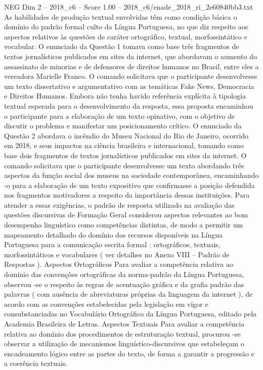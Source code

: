 \begin{textsample}{NEG Dim 2 – 2018\_c6 – Score 1.00 – 2018\_c6/enade\_2018\_ri\_2e60840bb3.txt}
As habilidades de produção textual envolvidas têm como condição básica o domínio do padrão formal culto da Língua Portuguesa, no que diz respeito aos aspectos relativos às questões de caráter ortográfico, textual, morfossintático e vocabular.
O enunciado da Questão 1 tomava como base três fragmentos de textos jornalísticos publicados em sites da internet, que abordavam o aumento do assassinato de minorias e de defensores de direitos humanos no Brasil, entre eles a vereadora Marielle Franco.
O comando solicitava que o participante desenvolvesse um texto dissertativo e argumentativo com as temáticas Fake News, Democracia e Direitos Humanos.
Embora não tenha havido referência explícita à tipologia textual esperada para o desenvolvimento da resposta, essa proposta encaminhou o participante para a elaboração de um texto opinativo, com o objetivo de discutir o problema e manifestar um posicionamento crítico.
O enunciado da Questão 2 abordava o incêndio do Museu Nacional do Rio de Janeiro, ocorrido em 2018, e seus impactos na ciência brasileira e internacional, tomando como base dois fragmentos de textos jornalísticos publicados em sites da internet.
O comando solicitava que o participante desenvolvesse um texto abordando três aspectos da função social dos museus na sociedade contemporânea, encaminhando -o para a elaboração de um texto expositivo que confirmasse a posição defendida nos fragmentos motivadores a respeito da importância dessas instituições.
Para atender a essas exigências, o padrão de resposta utilizado na avaliação das questões discursivas de Formação Geral considerou aspectos relevantes ao bom desempenho linguístico como competências distintas, de modo a permitir um mapeamento detalhado do domínio dos recursos disponíveis na Língua Portuguesa para a comunicação escrita formal : ortográficos, textuais, morfossintáticos e vocabulares ( ver detalhes no Anexo VIII – Padrão de Respostas ).
Aspectos Ortográficos Para avaliar a competência relativa ao domínio das convenções ortográficas da norma-padrão da Língua Portuguesa, observou -se o respeito às regras de acentuação gráfica e da grafia padrão das palavras ( com ausência de abreviaturas próprias da linguagem da internet ), de acordo com as convenções estabelecidas pela legislação em vigor e consubstanciadas no Vocabulário Ortográfico da Língua Portuguesa, editado pela Academia Brasileira de Letras.
Aspectos Textuais Para avaliar a competência relativa ao domínio dos procedimentos de estruturação textual, procurou -se observar a utilização de mecanismos linguístico-discursivos que estabeleçam o encadeamento lógico entre as partes do texto, de forma a garantir a progressão e a coerência textuais.

\end{textsample}

